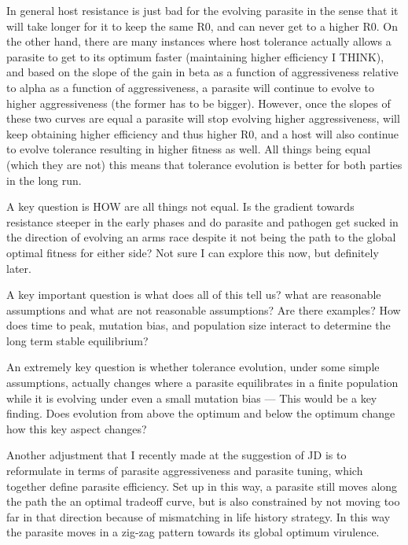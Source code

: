 In general host resistance is just bad for the evolving parasite in the sense that it will take longer for it to keep the same R0, and can never get to a higher R0. On the other hand, there are many instances where host tolerance actually allows a parasite to get to its optimum faster (maintaining higher efficiency I THINK), and based on the slope of the gain in beta as a function of aggressiveness relative to alpha as a function of aggressiveness, a parasite will continue to evolve to higher aggressiveness (the former has to be bigger). However, once the slopes of these two curves are equal a parasite will stop evolving higher aggressiveness, will keep obtaining higher efficiency and thus higher R0, and a host will also continue to evolve tolerance resulting in higher fitness as well. All things being equal (which they are not) this means that tolerance evolution is better for both parties in the long run. 

A key question is HOW are all things not equal. Is the gradient towards resistance steeper in the early phases and do parasite and pathogen get sucked in the direction of evolving an arms race despite it not being the path to the global optimal fitness for either side? Not sure I can explore this now, but definitely later.

A key important question is what does all of this tell us? what are reasonable assumptions and what are not reasonable assumptions? Are there examples? How does time to peak, mutation bias, and population size interact to determine the long term stable equilibrium? 

An extremely key question is whether tolerance evolution, under some simple assumptions, actually changes where a parasite equilibrates in a finite population while it is evolving under even a small mutation bias --- This would be a key finding. Does evolution from above the optimum and below the optimum change how this key aspect changes?

Another adjustment that I recently made at the suggestion of JD is to reformulate in terms of parasite aggressiveness and parasite tuning, which together define parasite efficiency. Set up in this way, a parasite still moves along the path the an optimal tradeoff curve, but is also constrained by not moving too far in that direction because of mismatching in life history strategy. In this way the parasite moves in a zig-zag pattern towards its global optimum virulence.

